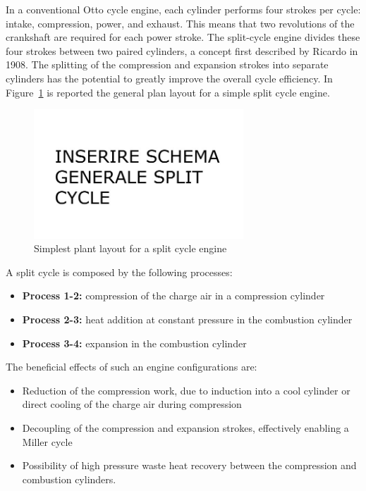 In a conventional Otto cycle engine, each cylinder performs four strokes per cycle: intake, compression, power, and exhaust. This means that two revolutions of the crankshaft are required for each power stroke. The split-cycle engine divides these four strokes between two paired cylinders, a concept first described by Ricardo in 1908. The splitting of the compression and expansion strokes into separate cylinders has the potential to greatly improve the overall cycle efficiency. In Figure~\ref{fig:split_simple} is reported the general plan layout for a simple split cycle engine.

\begin{figure}[ht]
  \centering
  \includegraphics[width=0.7\textwidth]{figures/review/split_simple.jpg}
  \caption{Simplest plant layout for a split cycle engine\label{fig:split_simple} }
\end{figure}

A split cycle is composed by the following processes:

\begin{itemize}
\item \textbf{Process 1-2:} compression of the charge air in a compression cylinder 
\item \textbf{Process 2-3:} heat addition at constant pressure in the combustion cylinder
\item \textbf{Process 3-4:} expansion in the combustion cylinder
\end{itemize}

The beneficial effects of such an engine configurations are:

\begin{itemize}
\item Reduction of the compression work, due to induction into a cool cylinder or direct cooling of the charge air during compression
\item Decoupling of the compression and expansion strokes, effectively enabling a Miller cycle
\item Possibility of high pressure waste heat recovery between the compression and combustion cylinders.
\end{itemize}

